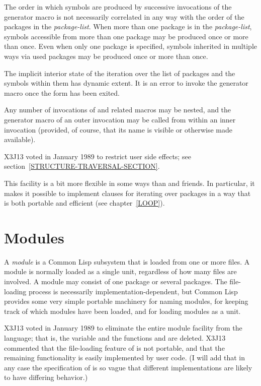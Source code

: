 \begin{new}
\begin{defmac}
The order in which symbols are produced by successive invocations
of the generator macro is not necessarily correlated in any way
with the order of the packages in the {\it package-list}.
When more than one package is in the {\it package-list},
symbols accessible from more than one package may be produced
once or more than once.  Even when only one package is specified,
symbols inherited in multiple ways via used packages may be
produced once or more than once.

The implicit interior state of the iteration over the list of packages
and the symbols within them has dynamic extent.
It is an error to invoke the generator macro
once the  form has been exited.

Any number of invocations of 
and related macros may be nested, and the generator macro of an
outer invocation may be called from within an inner invocation
(provided, of course, that its name is visible or otherwise made available).

X3J13 voted in January 1989
to restrict user side effects; see section~\ref{STRUCTURE-TRAVERSAL-SECTION}.

\beforenoterule
\begin{rationale}
This facility is a bit more flexible in some ways than 
and friends.
In particular, it makes it possible to implement 
clauses for iterating over packages in a way that is both portable
and efficient (see chapter~\ref{LOOP}).
\end{rationale}
\afternoterule
\end{defmac}
\end{new}

\section{Modules}

A {\it module} is a Common Lisp subsystem that is loaded from one or more
files.  A module is normally loaded as a single unit, regardless of how
many files are involved.  A module may consist of one package or several
packages.  The file-loading process is necessarily
implementation-dependent, but Common Lisp provides some very simple
portable machinery for naming modules, for keeping track of which modules
have been loaded, and for loading modules as a unit.

\begin{new}
X3J13 voted in January 1989
to eliminate the entire module facility from
the language; that is, the variable  and the functions
 and  are deleted.
X3J13 commented that the file-loading feature of  is not
portable, and that the remaining functionality is easily implemented
by user code.  (I will add that in any case the specification of
 is so vague that different implementations are likely to
have differing behavior.)
\end{new}

